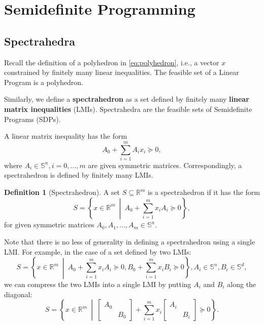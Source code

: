 \documentclass[
]{book}
\theoremstyle{definition}
\newtheorem{definition}{Definition}[chapter]
\theoremstyle{definition}
\theoremstyle{definition}
\theoremstyle{definition}
\theoremstyle{remark}
\begin{document}
\section{Semidefinite Programming}\label{semidefinite-programming}

\subsection{Spectrahedra}\label{spectrahedra}

Recall the definition of a polyhedron in \eqref{eq:polyhedron}, i.e., a vector \(x\) constrained by finitely many linear inequalities. The feasible set of a Linear Program is a polyhedron.

Similarly, we define a \textbf{spectrahedron} as a set defined by finitely many \textbf{linear matrix inequalities} (LMIs). Spectrahedra are the feasible sets of Semidefinite Programs (SDPs).

A linear matrix inequality has the form
\[
A_0 + \sum_{i=1}^m A_i x_i \succeq 0,
\]
where \(A_i \in \mathbb{S}^{n},i=0,\dots,m\) are given symmetric matrices. Correspondingly, a spectrahedron is defined by finitely many LMIs.

\begin{definition}[Spectrahedron]
\protect\hypertarget{def:Spectrahedron}{}\label{def:Spectrahedron}A set \(S \subseteq \mathbb{R}^{m}\) is a spectrahedron if it has the form
\[
S =  \left\{ x \in \mathbb{R}^{m} \ \middle\vert\ A_0 + \sum_{i=1}^m x_i A_i \succeq 0 \right\} ,
\]
for given symmetric matrices \(A_0,A_1,\dots,A_m \in \mathbb{S}^{n}\).
\end{definition}

Note that there is no less of generality in defining a spectrahedron using a single LMI. For example, in the case of a set defined by two LMIs:
\[
S =  \left\{ x \in \mathbb{R}^{m} \ \middle\vert\ A_0 + \sum_{i=1}^m x_i A_i \succeq 0, B_0 + \sum_{i=1}^m x_i B_i \succeq 0  \right\} , A_i \in \mathbb{S}^{n}, B_i \in \mathbb{S}^{d},
\]
we can compress the two LMIs into a single LMI by putting \(A_i\) and \(B_i\) along the diagonal:
\[
S =  \left\{ x \in \mathbb{R}^{m} \ \middle\vert\ \begin{bmatrix} A_0 & \\ & B_0 \end{bmatrix} + \sum_{i=1}^m x_i \begin{bmatrix} A_i & \\ & B_i \end{bmatrix} \succeq 0  \right\} .
\]
\end{document}
